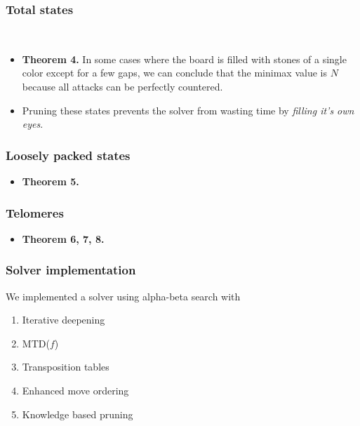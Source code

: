 \documentclass{beamer}
\begin{document}
    \begin{frame}
        \frametitle{Total states}
        \begin{center}
            \cleargoban
            \showgoban[b2,o2]\\\medskip
            \cleargoban
            \showgoban[b2,o2]
        \end{center}
        \begin{itemize}
            \item \textbf{Theorem 4.} In some cases where the board is filled with stones of a single color
                except for a few gaps, we can conclude that the minimax value is $N$ because all attacks can
                be perfectly countered.
            \item Pruning these states prevents the solver from wasting time by \textit{filling it's own eyes}.
        \end{itemize}
    \end{frame}

    \begin{frame}
        \frametitle{Loosely packed states}
        \begin{itemize}
            \item \textbf{Theorem 5.}
        \end{itemize}
    \end{frame}

    \begin{frame}
        \frametitle{Telomeres}
        \begin{itemize}
            \item \textbf{Theorem 6, 7, 8.}
        \end{itemize}
    \end{frame}

    \begin{frame}
        \frametitle{Solver implementation}
        We implemented a solver using alpha-beta search with
        \begin{enumerate}
            \item Iterative deepening
            \item MTD($f$)
            \item Transposition tables
            \item Enhanced move ordering
            \item Knowledge based pruning
        \end{enumerate}
    \end{frame}
\end{document}
